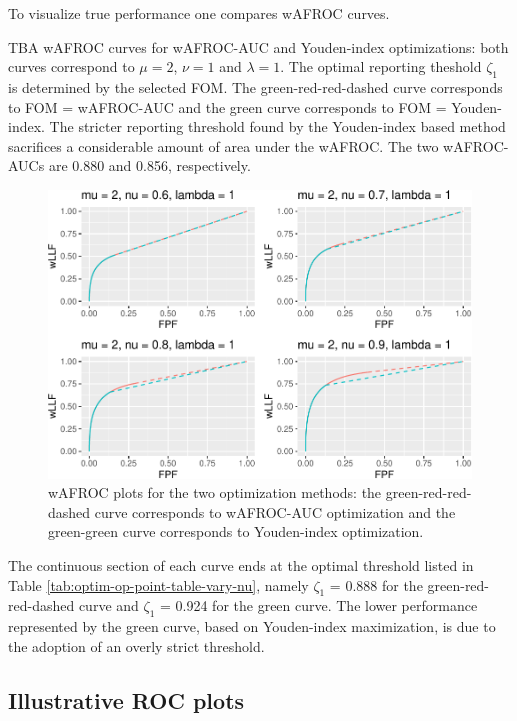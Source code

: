 \documentclass[
]{book}
\begin{document}
To visualize true performance one compares wAFROC curves.

TBA wAFROC curves for wAFROC-AUC and Youden-index optimizations: both curves correspond to \(\mu = 2\), \(\nu = 1\) and \(\lambda = 1\). The optimal reporting theshold \(\zeta_1\) is determined by the selected FOM. The green-red-red-dashed curve corresponds to FOM = wAFROC-AUC and the green curve corresponds to FOM = Youden-index. The stricter reporting threshold found by the Youden-index based method sacrifices a considerable amount of area under the wAFROC. The two wAFROC-AUCs are 0.880 and 0.856, respectively.

\begin{figure}
\centering
\includegraphics{21-optim-op-point_files/figure-latex/optim-op-point-vary-nu-wafroc-1.pdf}
\caption{\label{fig:optim-op-point-vary-nu-wafroc}wAFROC plots for the two optimization methods: the green-red-red-dashed curve corresponds to wAFROC-AUC optimization and the green-green curve corresponds to Youden-index optimization.}
\end{figure}

The continuous section of each curve ends at the optimal threshold listed in Table \ref{tab:optim-op-point-table-vary-nu}, namely \(\zeta_1\) = 0.888 for the green-red-red-dashed curve and \(\zeta_1\) = 0.924 for the green curve. The lower performance represented by the green curve, based on Youden-index maximization, is due to the adoption of an overly strict threshold.

\hypertarget{illustrative-roc-plots}{%
\subsection{Illustrative ROC plots}\label{illustrative-roc-plots}}
\end{document}
